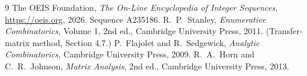 \documentclass[11pt,a4paper]{article}
\theoremstyle{plain}
\theoremstyle{definition}
\begin{document}
\begin{thebibliography}{9}
 The OEIS Foundation, \emph{The On-Line Encyclopedia of Integer
Sequences}, \url{https://oeis.org}, 2026. Sequence A235186.
 R.~P.~Stanley, \emph{Enumerative Combinatorics}, Volume 1, 2nd ed.,
Cambridge University Press, 2011. (Transfer-matrix method, Section 4.7.)
 P.~Flajolet and R.~Sedgewick, \emph{Analytic Combinatorics}, Cambridge
University Press, 2009.
 R.~A.~Horn and C.~R.~Johnson, \emph{Matrix Analysis}, 2nd ed., Cambridge
University Press, 2013.
\end{thebibliography}
\end{document}
